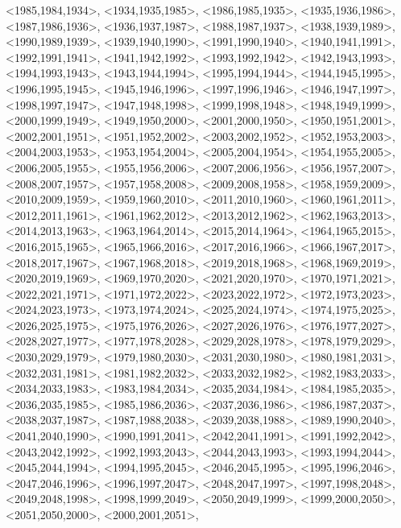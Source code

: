 \documentclass[a4paper,10pt]{article}
\begin{document}
\begin{eulernotebook}
\begin{euleroutput}
  <1985,1984,1934>,
  <1934,1935,1985>,
  <1986,1985,1935>,
  <1935,1936,1986>,
  <1987,1986,1936>,
  <1936,1937,1987>,
  <1988,1987,1937>,
  <1938,1939,1989>,
  <1990,1989,1939>,
  <1939,1940,1990>,
  <1991,1990,1940>,
  <1940,1941,1991>,
  <1992,1991,1941>,
  <1941,1942,1992>,
  <1993,1992,1942>,
  <1942,1943,1993>,
  <1994,1993,1943>,
  <1943,1944,1994>,
  <1995,1994,1944>,
  <1944,1945,1995>,
  <1996,1995,1945>,
  <1945,1946,1996>,
  <1997,1996,1946>,
  <1946,1947,1997>,
  <1998,1997,1947>,
  <1947,1948,1998>,
  <1999,1998,1948>,
  <1948,1949,1999>,
  <2000,1999,1949>,
  <1949,1950,2000>,
  <2001,2000,1950>,
  <1950,1951,2001>,
  <2002,2001,1951>,
  <1951,1952,2002>,
  <2003,2002,1952>,
  <1952,1953,2003>,
  <2004,2003,1953>,
  <1953,1954,2004>,
  <2005,2004,1954>,
  <1954,1955,2005>,
  <2006,2005,1955>,
  <1955,1956,2006>,
  <2007,2006,1956>,
  <1956,1957,2007>,
  <2008,2007,1957>,
  <1957,1958,2008>,
  <2009,2008,1958>,
  <1958,1959,2009>,
  <2010,2009,1959>,
  <1959,1960,2010>,
  <2011,2010,1960>,
  <1960,1961,2011>,
  <2012,2011,1961>,
  <1961,1962,2012>,
  <2013,2012,1962>,
  <1962,1963,2013>,
  <2014,2013,1963>,
  <1963,1964,2014>,
  <2015,2014,1964>,
  <1964,1965,2015>,
  <2016,2015,1965>,
  <1965,1966,2016>,
  <2017,2016,1966>,
  <1966,1967,2017>,
  <2018,2017,1967>,
  <1967,1968,2018>,
  <2019,2018,1968>,
  <1968,1969,2019>,
  <2020,2019,1969>,
  <1969,1970,2020>,
  <2021,2020,1970>,
  <1970,1971,2021>,
  <2022,2021,1971>,
  <1971,1972,2022>,
  <2023,2022,1972>,
  <1972,1973,2023>,
  <2024,2023,1973>,
  <1973,1974,2024>,
  <2025,2024,1974>,
  <1974,1975,2025>,
  <2026,2025,1975>,
  <1975,1976,2026>,
  <2027,2026,1976>,
  <1976,1977,2027>,
  <2028,2027,1977>,
  <1977,1978,2028>,
  <2029,2028,1978>,
  <1978,1979,2029>,
  <2030,2029,1979>,
  <1979,1980,2030>,
  <2031,2030,1980>,
  <1980,1981,2031>,
  <2032,2031,1981>,
  <1981,1982,2032>,
  <2033,2032,1982>,
  <1982,1983,2033>,
  <2034,2033,1983>,
  <1983,1984,2034>,
  <2035,2034,1984>,
  <1984,1985,2035>,
  <2036,2035,1985>,
  <1985,1986,2036>,
  <2037,2036,1986>,
  <1986,1987,2037>,
  <2038,2037,1987>,
  <1987,1988,2038>,
  <2039,2038,1988>,
  <1989,1990,2040>,
  <2041,2040,1990>,
  <1990,1991,2041>,
  <2042,2041,1991>,
  <1991,1992,2042>,
  <2043,2042,1992>,
  <1992,1993,2043>,
  <2044,2043,1993>,
  <1993,1994,2044>,
  <2045,2044,1994>,
  <1994,1995,2045>,
  <2046,2045,1995>,
  <1995,1996,2046>,
  <2047,2046,1996>,
  <1996,1997,2047>,
  <2048,2047,1997>,
  <1997,1998,2048>,
  <2049,2048,1998>,
  <1998,1999,2049>,
  <2050,2049,1999>,
  <1999,2000,2050>,
  <2051,2050,2000>,
  <2000,2001,2051>,

\end{euleroutput}
\end{eulernotebook}
\end{document}
